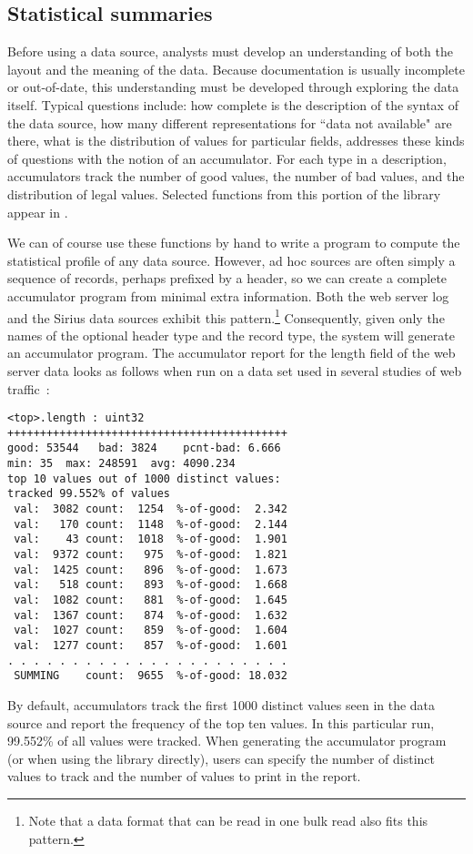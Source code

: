 \documentclass[times]{acm-sigplan}
\newcommand{\dibbler}{Sirius}
\begin{document}
\subsection{Statistical summaries}
Before using a data source, analysts must develop an understanding 
of both the layout and the meaning of the data.  
Because documentation is usually
incomplete or out-of-date, this understanding must be developed 
through exploring the data itself.  Typical questions include:
how complete is the description of the syntax of the data source,
how many different representations for ``data not available" are there,
what is the distribution of values for particular fields, \etc{}
\pads{} addresses these kinds of questions with the notion of an accumulator. 
For each type in a \pads{} description, accumulators track the number of good values, the number of bad values, and the 
distribution of legal values.  Selected functions from this portion of the library appear in .  

We can of course use these functions by hand to write
a program to compute the statistical profile of any \pads{} data source.
However, ad hoc sources are often simply a sequence of records, perhaps prefixed by a header, so we can create a complete accumulator program from minimal extra information.  Both the web server log and the \dibbler{} data sources exhibit this pattern.\footnote{
  Note that a data format that can be read in one bulk read also fits this pattern.
} 
Consequently, given only the names of the optional
header type and the record type, the \pads{} system will generate 
an accumulator program.  The accumulator report for the length field
of the web server data looks as follows when run on a data set used
in several studies of web traffic~\cite{clf-cluster, clf-adaptation}:

\begin{small}
\begin{verbatim}
<top>.length : uint32
+++++++++++++++++++++++++++++++++++++++++++
good: 53544   bad: 3824    pcnt-bad: 6.666
min: 35  max: 248591  avg: 4090.234
top 10 values out of 1000 distinct values:
tracked 99.552% of values
 val:  3082 count:  1254  %-of-good:  2.342
 val:   170 count:  1148  %-of-good:  2.144
 val:    43 count:  1018  %-of-good:  1.901
 val:  9372 count:   975  %-of-good:  1.821
 val:  1425 count:   896  %-of-good:  1.673
 val:   518 count:   893  %-of-good:  1.668
 val:  1082 count:   881  %-of-good:  1.645
 val:  1367 count:   874  %-of-good:  1.632
 val:  1027 count:   859  %-of-good:  1.604
 val:  1277 count:   857  %-of-good:  1.601
. . . . . . . . . . . . . . . . . . . . . . 
 SUMMING    count:  9655  %-of-good: 18.032
\end{verbatim}
\end{small}
%
By default, accumulators track the first 1000 distinct
values seen in the data source and report the frequency
of the top ten values.  In this particular run, 99.552\%
of all values were tracked.  When generating the accumulator
program (or when using the library directly), \pads{} users can specify 
the number of distinct values to track and the number 
of values to print in the report.
\end{document}
